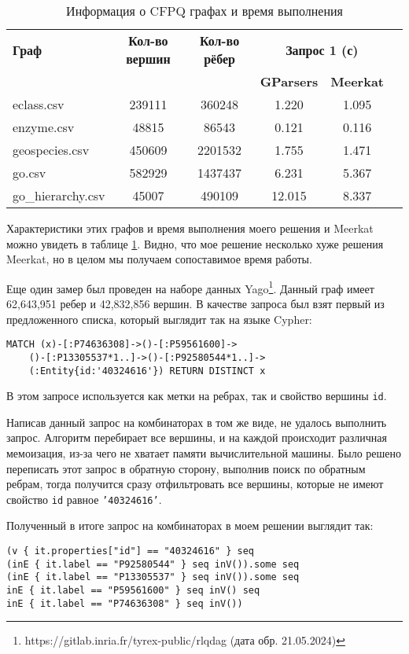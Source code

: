\begin{table}[h]
    \caption{Информация о CFPQ графах и время выполнения}
    \begin{tabular}{|l|c|c|c|c|c|}
        
    \hline
    \textbf{Граф} & \textbf{Кол-во вершин} & \textbf{Кол-во рёбер} & \multicolumn{2}{|c|}{\textbf{Запрос 1 (с)}} \\
    \cline{4-5}
    & & & \textbf{GParsers} & \textbf{Meerkat} \\
    \hline
    eclass.csv & 239111 & 360248 & 1.220 & 1.095 \\
    enzyme.csv & 48815 & 86543 & 0.121 & 0.116 \\
    geospecies.csv & 450609 & 2201532 & 1.755 & 1.471 \\
    go.csv & 582929 & 1437437 & 6.231 & 5.367 \\
    go\_hierarchy.csv & 45007 & 490109 & 12.015 & 8.337 \\
    \hline
    \end{tabular}
    \label{tab:CFPQTimes}
\end{table}

Характеристики этих графов и время выполнения моего решения и Meerkat можно увидеть в таблице \ref{tab:CFPQTimes}. Видно, что мое решение несколько хуже решения Meerkat, но в целом мы получаем сопоставимое время работы.

Еще один замер был проведен на наборе данных Yago\footnote{https://gitlab.inria.fr/tyrex-public/rlqdag (дата обр. 21.05.2024)}. Данный граф имеет 62,643,951 ребер и 42,832,856 вершин. В качестве запроса был взят первый из предложенного списка, который выглядит так на языке Cypher:
\begin{Verbatim}
MATCH (x)-[:P74636308]->()-[:P59561600]->
    ()-[:P13305537*1..]->()-[:P92580544*1..]->
    (:Entity{id:'40324616'}) RETURN DISTINCT x
\end{Verbatim}

В этом запросе используется как метки на ребрах, так и свойство вершины \texttt{id}. 

Написав данный запрос на комбинаторах в том же виде, не удалось выполнить запрос. Алгоритм перебирает все вершины, и на каждой происходит различная мемоизация, из-за чего не хватает памяти вычислительной машины. Было решено переписать этот запрос в обратную сторону, выполнив поиск по обратным ребрам, тогда получится сразу отфильтровать все вершины, которые не имеют свойство \texttt{id} равное \texttt{'40324616'}. 

Полученный в итоге запрос на комбинаторах в моем решении выглядит так:
\begin{lstlisting}
(v { it.properties["id"] == "40324616" } seq
(inE { it.label == "P92580544" } seq inV()).some seq
(inE { it.label == "P13305537" } seq inV()).some seq
inE { it.label == "P59561600" } seq inV() seq
inE { it.label == "P74636308" } seq inV())
\end{lstlisting}

